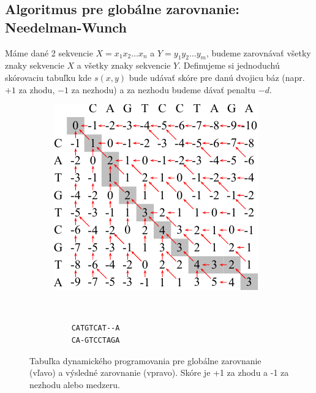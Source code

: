 \subsection{Algoritmus pre globálne zarovnanie: Needelman-Wunch}
\label{subsec:global-alignment}
Máme dané 2 sekvencie $X = x_1x_2\dots x_n$ a $Y = y_1y_2\dots y_m$, budeme zarovnávať všetky znaky sekvencie $X$ a všetky znaky sekvencie $Y$.
Definujeme si jednoduchú skórovaciu tabuľku kde $s(x, y)$ bude udávať skóre pre danú dvojicu báz (napr. $+1$ za zhodu, $-1$ za nezhodu) a za nezhodu budeme dávať penaltu $-d$.


\begin{figure}[htp]
    \centering
    \begin{subfigure}[m]{0.5\textwidth}
    \centering
    \includegraphics[width=\textwidth]{images/global_alignment}
    \end{subfigure}
    ~
    \begin{subfigure}[m]{0.3\textwidth}
    \centering
    \begin{verbatim}
    CATGTCAT--A
    CA-GTCCTAGA
    \end{verbatim}
    \end{subfigure}
    \caption[Tabuľka dyn. programovania pre  globálne zarovnanie]{Tabuľka dynamického programovania pre  globálne zarovnanie (vľavo) a výsledné zarovnanie (vpravo). Skóre je +1 za zhodu a -1 za nezhodu alebo medzeru.}
    \label{fig:global-align}
\end{figure}

